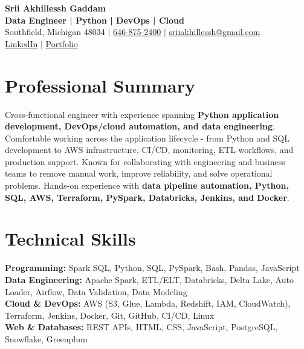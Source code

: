 \documentclass[letterpaper,10pt]{article}
\begin{document}
\fontsize{9.35pt}{10.45pt}\selectfont

\begin{center}
    {\LARGE \textbf{Srii Akhillessh Gaddam}} \\[-1pt]
    \textbf{Data Engineer | Python | DevOps | Cloud} \\[2pt]
    Southfield, Michigan 48034 $|$
    \href{tel:6468752400}{646-875-2400} $|$
    \href{mailto:sriiakhillessh@gmail.com}{sriiakhillessh@gmail.com} \\[1pt]
    \href{https://www.linkedin.com/in/srii-akhiilessh-gaddam-b48668191/}{LinkedIn} $|$
    \href{https://sriiakhillesshg.github.io/portfolio/}{Portfolio}
\end{center}
\vspace{-8pt}

\section{Professional Summary}
\small{Cross-functional engineer with experience spanning \textbf{Python application development, DevOps/cloud automation, and data engineering}. Comfortable working across the application lifecycle - from Python and SQL development to AWS infrastructure, CI/CD, monitoring, ETL workflows, and production support. Known for collaborating with engineering and business teams to remove manual work, improve reliability, and solve operational problems. Hands-on experience with \textbf{data pipeline automation, Python, SQL, AWS, Terraform, PySpark, Databricks, Jenkins, and Docker}.}

\section{Technical Skills}
\small{
\textbf{Programming:} Spark SQL, Python, SQL, PySpark, Bash, Pandas, JavaScript \\
\textbf{Data Engineering:} Apache Spark, ETL/ELT, Databricks, Delta Lake, Auto Loader, Airflow, Data Validation, Data Modeling \\
\textbf{Cloud \& DevOps:} AWS (S3, Glue, Lambda, Redshift, IAM, CloudWatch), Terraform, Jenkins, Docker, Git, GitHub, CI/CD, Linux \\
\textbf{Web \& Databases:} REST APIs, HTML, CSS, JavaScript, PostgreSQL, Snowflake, Greenplum
}

\end{document}
